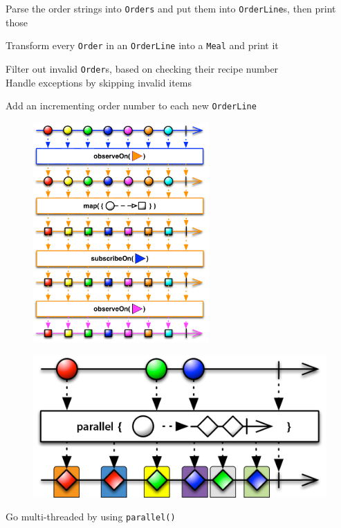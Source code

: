 \begin{frame}{{}}
    \centering
    \Large
    Parse the order strings into \texttt{Orders} and put them into \texttt{OrderLine}s, then print those
\end{frame}

\begin{frame}{{}}
    \centering
    \Large
    Transform every \texttt{Order} in an \texttt{OrderLine} into a \texttt{Meal} and print it
\end{frame}

\begin{frame}{{}}
    \centering
    \Large
    Filter out invalid \texttt{Order}s, based on checking their recipe number\\
    Handle exceptions by skipping invalid items
\end{frame}

\begin{frame}{{}}
    \centering
    \Large
    Add an incrementing order number to each new \texttt{OrderLine}
\end{frame}

\begin{frame}{{}}
	\begin{figure}[h]
		\includegraphics[width=0.6\textwidth,page=1]{gfx/schedulers}
	\end{figure}
\end{frame}

\begin{frame}{{}}
	\begin{figure}[h]
		\includegraphics[width=1.0\textwidth,page=1]{gfx/parallel}
	\end{figure}
\end{frame}

\begin{frame}{{}}
    \centering
    \Large
    Go multi-threaded by using \texttt{parallel()}
\end{frame}
